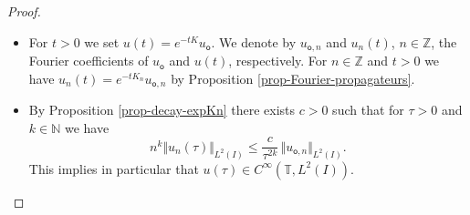\documentclass[11pt]{article}
\newcommand{\skpt}{\smallskip}
\numberwithin{equation}{section}
\theoremstyle{plain}
\theoremstyle{definition}
\newcommand{\nr}[1]{\Vert #1\Vert}
\newcommand{\1}{\mathds 1}
\newcommand{\N}{\mathbb{N}}
\newcommand{\Z}{\mathbb{Z}}
\newcommand{\T}{\mathbb{T}}
\newcommand{\uo}{u_{\mathsf{o}}}
\newcommand{\uon}{u_{\mathsf{o},n}}
\begin{document}
\skpt
\begin{proof}
\begin{itemize}
\item
For $t > 0$ we set $u(t) = e^{-tK} \uo$. We denote by $\uon$ and $u_n(t)$, $n \in \Z$, the Fourier coefficients of $\uo$ and $u(t)$, respectively. For $n \in \Z$ and $t > 0$ we have $u_n(t) = e^{-t K_n} \uon$ by Proposition \ref{prop-Fourier-propagateurs}.

\item
By Proposition \ref{prop-decay-expKn} there exists $c > 0$ such that for $\tau > 0$ and $k \in \N$ we have
\begin{equation} \label{eq-estim-nk-un}
n^k \nr{u_n(\tau)}_{L^2(I)} \leq \frac c {\tau^{2k}}\, \nr{\uon}_{L^2(I)}.
\end{equation}
This implies in particular that $u(\tau) \in C^\infty(\T,L^2(I))$.


\end{itemize}
\end{proof}
\end{document}
